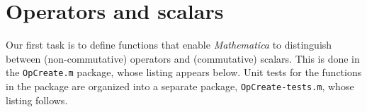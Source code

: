 \documentclass{article}
\begin{document}
\section{Operators and scalars}

Our first task is to define functions that enable \emph{Mathematica} to distinguish between (non-commutative) operators and (commutative) scalars.  This is done in the \verb+OpCreate.m+ package, whose listing appears below.  Unit tests for the functions in the package are organized into a separate package, \verb+OpCreate-tests.m+, whose listing follows. 



\end{document}
